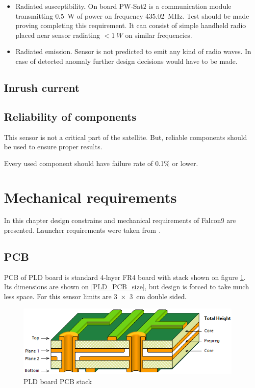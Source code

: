 \begin{itemize}
		\item Radiated susceptibility.
			On board PW-Sat2 is a communication module transmitting \SI{0.5}{W} of power on frequency \SI{435.02}{MHz}. Test should be made proving completing this requirement. It can consist of simple handheld radio placed near sensor radiating $< \SI{1}{W}$ on similar frequencies.
			
		\item Radiated emission.
			Sensor is not predicted to emit any kind of radio waves. In case of detected anomaly further design decisions would have to be made.
		
	\end{itemize}


\subsection{Inrush current}

\subsection{Reliability of components}
	This sensor is not a critical part of the satellite. But, reliable components should be used to ensure proper results. 
	
	Every used component should have failure rate of 0.1\% or lower.


\section{Mechanical requirements}
	In this chapter design constrains and mechanical requirements of Falcon9 are presented. Launcher requirements were taken from \cite{Falcon9_user_manual}.
	
\subsection{PCB}
\label{PCB_description}
	PCB of PLD board is standard 4-layer FR4 board with stack shown on figure \ref{PLD_PCB_stack}. Its dimensions are shown on \ref{PLD_PCB_size}, but design is forced to take much less space. For this sensor limits are \SI{3x3}{cm} double sided.

	\begin{figure}[H]
		\centering
		\includegraphics[width=0.5\paperwidth]{img/PLD_PCB_stack.png}
		\caption{PLD board PCB stack}
		\label{PLD_PCB_stack}
	\end{figure}	

